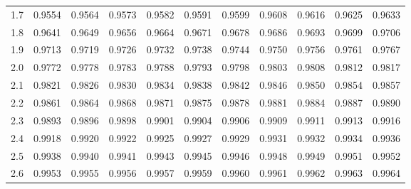\begin{table}[p]
\begin{center}
{\begin{tabular}{c | rrrrr | rrrrr |}
  1.7 & \scriptsize{0.9554} & \scriptsize{0.9564} & \scriptsize{0.9573} & \scriptsize{0.9582} & \scriptsize{0.9591} & \scriptsize{0.9599} & \scriptsize{0.9608} & \scriptsize{0.9616} & \scriptsize{0.9625} & \scriptsize{0.9633} \\
  1.8 & \scriptsize{0.9641} & \scriptsize{0.9649} & \scriptsize{0.9656} & \scriptsize{0.9664} & \scriptsize{0.9671} & \scriptsize{0.9678} & \scriptsize{0.9686} & \scriptsize{0.9693} & \scriptsize{0.9699} & \scriptsize{0.9706} \\
  1.9 & \scriptsize{0.9713} & \scriptsize{0.9719} & \scriptsize{0.9726} & \scriptsize{0.9732} & \scriptsize{0.9738} & \scriptsize{0.9744} & \scriptsize{0.9750} & \scriptsize{0.9756} & \scriptsize{0.9761} & \scriptsize{0.9767} \\
  \hline
  \hline
  2.0 & \scriptsize{0.9772} & \scriptsize{0.9778} & \scriptsize{0.9783} & \scriptsize{0.9788} & \scriptsize{0.9793} & \scriptsize{0.9798} & \scriptsize{0.9803} & \scriptsize{0.9808} & \scriptsize{0.9812} & \scriptsize{0.9817} \\
  2.1 & \scriptsize{0.9821} & \scriptsize{0.9826} & \scriptsize{0.9830} & \scriptsize{0.9834} & \scriptsize{0.9838} & \scriptsize{0.9842} & \scriptsize{0.9846} & \scriptsize{0.9850} & \scriptsize{0.9854} & \scriptsize{0.9857} \\
  2.2 & \scriptsize{0.9861} & \scriptsize{0.9864} & \scriptsize{0.9868} & \scriptsize{0.9871} & \scriptsize{0.9875} & \scriptsize{0.9878} & \scriptsize{0.9881} & \scriptsize{0.9884} & \scriptsize{0.9887} & \scriptsize{0.9890} \\
  2.3 & \scriptsize{0.9893} & \scriptsize{0.9896} & \scriptsize{0.9898} & \scriptsize{0.9901} & \scriptsize{0.9904} & \scriptsize{0.9906} & \scriptsize{0.9909} & \scriptsize{0.9911} & \scriptsize{0.9913} & \scriptsize{0.9916} \\
  2.4 & \scriptsize{0.9918} & \scriptsize{0.9920} & \scriptsize{0.9922} & \scriptsize{0.9925} & \scriptsize{0.9927} & \scriptsize{0.9929} & \scriptsize{0.9931} & \scriptsize{0.9932} & \scriptsize{0.9934} & \scriptsize{0.9936} \\
  \hline
  2.5 & \scriptsize{0.9938} & \scriptsize{0.9940} & \scriptsize{0.9941} & \scriptsize{0.9943} & \scriptsize{0.9945} & \scriptsize{0.9946} & \scriptsize{0.9948} & \scriptsize{0.9949} & \scriptsize{0.9951} & \scriptsize{0.9952} \\
  2.6 & \scriptsize{0.9953} & \scriptsize{0.9955} & \scriptsize{0.9956} & \scriptsize{0.9957} & \scriptsize{0.9959} & \scriptsize{0.9960} & \scriptsize{0.9961} & \scriptsize{0.9962} & \scriptsize{0.9963} & \scriptsize{0.9964} \\

\end{tabular}}
\end{center}
\end{table}
